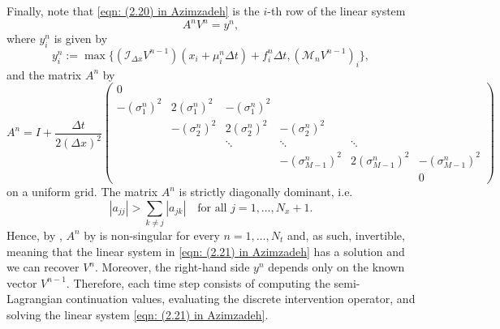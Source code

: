 Finally, note that \eqref{eqn: (2.20) in Azimzadeh} is the $i$-th row of the linear system
\begin{equation}
    A^nV^n = y^n,
    \label{eqn: (2.21) in Azimzadeh}
\end{equation}
where $y_i^n$ is given by
\begin{equation*}
    y_i^n := \max \big\{ (\mathcal{I}_{\Delta x} V^{n-1})(x_i+\mu_i^n \Delta t) + f_i^n \Delta t, (\mathcal{M}_n V^{n-1})_i \big\},
\end{equation*}
and the matrix $A^n$ by
\begin{equation*}
    A^n = I + \frac{\Delta t}{2 (\Delta x)^2}
    \begin{pmatrix}
        0 \\
        -(\sigma_1^n)^2 & 2(\sigma_1^n)^2 & -(\sigma_1^n)^2 \\
        & -(\sigma_2^n)^2 & 2(\sigma_2^n)^2 & -(\sigma_2^n)^2 \\
        & & \ddots & \ddots & \ddots \\
        & & & -(\sigma_{M-1}^n)^2 & 2(\sigma_{M-1}^n)^2 & -(\sigma_{M-1}^n)^2 \\
        & & & & & 0
    \end{pmatrix}
\end{equation*}
on a uniform grid. The matrix $A^n$ is strictly diagonally dominant, i.e. 
\begin{equation*}
    |a_{jj}| > \sum_{k \neq j} |a_{jk}| \quad \text{for all } j = 1, \ldots, N_x + 1.
\end{equation*}
Hence, by \cite[Theorem 1.21]{varga2000matrix}, $A^n$ by is non-singular for every $n = 1, \ldots, N_t$ and, as such, invertible, meaning that the linear system in \eqref{eqn: (2.21) in Azimzadeh} has a solution and we can recover $V^n$. Moreover, the right-hand side $y^n$ depends only on the known vector $V^{n-1}$. Therefore, each time step consists of computing the semi-Lagrangian continuation values, evaluating the discrete intervention operator, and solving the linear system \eqref{eqn: (2.21) in Azimzadeh}. 


